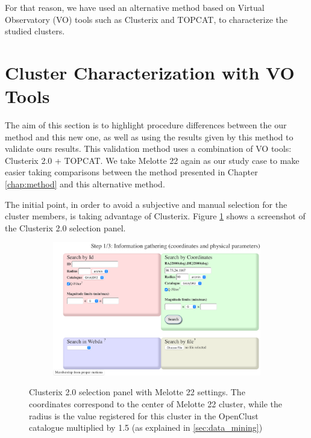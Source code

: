 \documentclass[11pt, a4paper, english]{book}
\begin{document}
For that reason, we have used an alternative method based on Virtual Observatory (VO) tools such as Clusterix and TOPCAT,
to characterize the studied clusters.

\section{Cluster Characterization with VO Tools}

The aim of this section is to highlight procedure differences between the our method and this new one,
as well as using the results given by this method to validate ours results.
This validation method uses a combination of VO tools: Clusterix 2.0 + TOPCAT.
We take Melotte 22 again as our study case to make easier taking comparisons between the method presented in Chapter \ref{chap:method}
and this alternative method.

The initial point, in order to avoid a subjective and manual selection for the cluster members, is taking advantage of Clusterix.
Figure \ref{fig:clusterix_selection} shows a screenshot of the Clusterix 2.0 selection panel.

\begin{figure}[htbp]
  \centering
  \begin{subfigure}{0.9\textwidth}
    \centering
    \includegraphics[width=\textwidth]{../figures/clusterix/clusterix_selection_panel_melotte_22.png}
  \end{subfigure}
  \caption{Clusterix 2.0 selection panel with Melotte 22 settings.
           The coordinates correspond to the center of Melotte 22 cluster,
           while the radius is the value registered for this cluster in the
           OpenClust catalogue multiplied by 1.5 (as explained in \ref{sec:data_mining})}
  \label{fig:clusterix_selection}
\end{figure}
\end{document}
